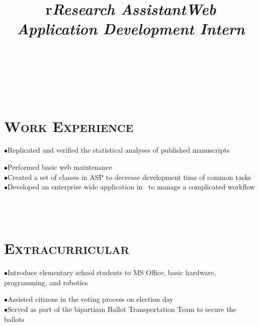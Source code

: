 \begin{resume}
\begin{formatb}
  \title{r}\\
  \\
  \body\\
\end{formatb}

\section{\textsc{Work Experience}}

\title{\textit{Research Assistant}}
\begin{position}
$\bullet$Replicated and verified the statistical analyses of published manuscripts
\end{position}


\title{\textit{Web Application Development Intern}}
\begin{position}
$\bullet$Performed basic web maintenance \\
$\bullet$Created a set of classes in ASP to decrease development time of common tasks \\
$\bullet$Developed an enterprise wide application in \CSharp \ to manage a complicated workflow 
\end{position}


\begin{formatb}
  \\
  \body\\
\end{formatb}

\section{\textsc{Extracurricular}}
\begin{position}
$\bullet$Introduce elementary school students to MS Office, basic hardware, programming, and robotics
\end{position}

\begin{position}
$\bullet$Assisted citizens in the voting process on election day \\
$\bullet$Served as part of the bipartisan Ballot Transportation Team to secure the ballots
\end{position}



\end{resume}


